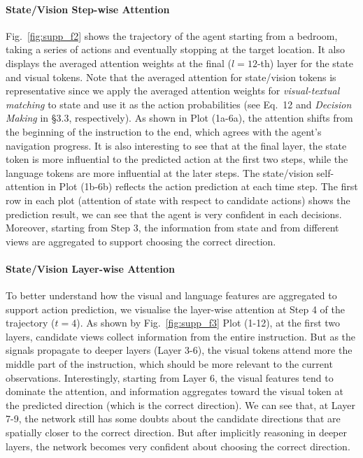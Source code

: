\documentclass[final]{cvpr}
\begin{document}
\paragraph{State/Vision Step-wise Attention}
Fig.~\ref{fig:supp_f2} shows the trajectory of the agent starting from a bedroom, taking a series of actions and eventually stopping at the target location. It also displays the averaged attention weights at the final ($l{=}12$-th) layer for the state and visual tokens. Note that the averaged attention for state/vision tokens is representative since we apply the averaged attention weights for \textit{visual-textual matching} to state and use it as the action probabilities (see Eq.~12 and \textit{Decision Making} in \S 3.3, respectively). As shown in Plot (1a-6a), the attention shifts from the beginning of the instruction to the end, which agrees with the agent's navigation progress. It is also interesting to see that at the final layer, the state token is more influential to the predicted action at the first two steps, while the language tokens are more influential at the later steps. The state/vision self-attention in Plot (1b-6b) reflects the action prediction at each time step. The first row in each plot (attention of state with respect to candidate actions) shows the prediction result, we can see that the agent is very confident in each decisions. Moreover, starting from Step 3, the information from state and from different views are aggregated to support choosing the correct direction.

\paragraph{State/Vision Layer-wise Attention}
To better understand how the visual and language features are aggregated to support action prediction, we visualise the layer-wise attention at Step 4 of the trajectory ($t{=}4$). As shown by Fig.~\ref{fig:supp_f3} Plot (1-12), at the first two layers, candidate views collect information from the entire instruction. But as the signals propagate to deeper layers (Layer 3-6), the visual tokens attend more the middle part of the instruction, which should be more relevant to the current observations. Interestingly, starting from Layer 6, the visual features tend to dominate the attention, and information aggregates toward the visual token at the predicted direction (which is the correct direction). We can see that, at Layer 7-9, the network still has some doubts about the candidate directions that are spatially closer to the correct direction. But after implicitly reasoning in deeper layers, the network becomes very confident about choosing the correct direction.
\end{document}

